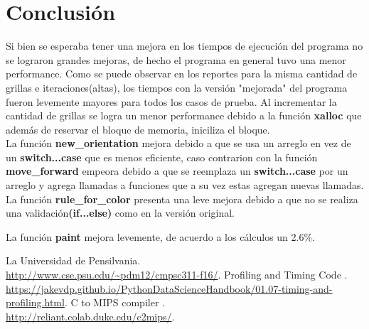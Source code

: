 \documentclass[a4paper, 10pt, twoside, notitlepage]{article}
\begin{document}
\section{Conclusión}

Si bien se esperaba tener una mejora en los tiempos de ejecución del programa no se lograron grandes mejoras, de hecho el programa en general tuvo una menor performance. Como se puede observar en los reportes para la misma cantidad de grillas e iteraciones(altas), los tiempos con la versión "mejorada" del programa fueron levemente mayores para todos los casos de prueba. Al incrementar la cantidad de grillas se logra un menor performance debido a la función \textbf{xalloc} que además de reservar el bloque de memoria, iniciliza el bloque. \\

La función \textbf{new\_orientation} mejora debido a que se usa un arreglo en vez de un \textbf{switch...case} que es menos eficiente, caso contrarion con la función \textbf{move\_forward} empeora debido a que se reemplaza un \textbf{switch...case} por un arreglo y agrega llamadas a funciones que a su vez estas agregan nuevas llamadas. La función \textbf{rule\_for\_color} presenta una leve mejora debido a que no se realiza una validación\textbf{(if...else)} como en la versión original.

La función \textbf{paint} mejora levemente, de acuerdo a los  cálculos un 2.6\%.




\vspace{.5cm}
\begin{thebibliography}{5}
 \bibitem{} La Universidad de Pensilvania.\\ \url{http://www.cse.psu.edu/~pdm12/cmpsc311-f16/}.
 \bibitem{} Profiling and Timing Code
.\\ \url{https://jakevdp.github.io/PythonDataScienceHandbook/01.07-timing-and-profiling.html}.
 \bibitem{} C to MIPS compiler
.\\ \url{http://reliant.colab.duke.edu/c2mips/}.
\end{thebibliography}
 
\end{document}
